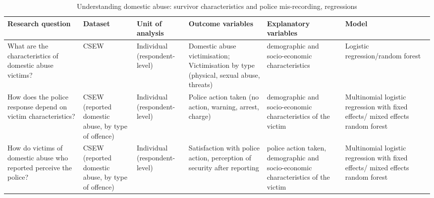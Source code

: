 \documentclass[11pt, a4paper]{article}
\begin{document}
\begin{table}[!htbp]
\caption{Understanding domestic abuse: survivor characteristics and police mis-recording, regressions}
  \begin{threeparttable}[t]
  \centering
       \begin{tabular}{ L{2.8cm}  C{1.8cm}  C{1.8cm}  C{3.2cm}  C{2.8cm}  C{2cm} }
    \toprule
     \textbf{Research question} & \textbf{Dataset}    & \textbf{Unit of analysis} & \textbf{Outcome variables} & \textbf{Explanatory variables} & \textbf{Model} \\
    \midrule
    What are the characteristics of domestic abuse victims? & CSEW & Individual (respondent-level) & Domestic abuse victimisation; Victimisation by type (physical, sexual abuse, threats) & demographic and socio-economic characteristics & Logistic regression/random forest \\
        \midrule
    How does the police response depend on victim characteristics? & CSEW (reported domestic abuse, by type of offence) & Individual (respondent-level) & Police action taken (no action, warning, arrest, charge) & demographic and socio-economic characteristics of the victim & Multinomial logistic regression with  fixed effects/ mixed effects random forest \\
     \midrule
    How do victims of domestic abuse who reported perceive the police? & CSEW (reported domestic abuse, by type of offence) & Individual (respondent-level)& Satisfaction with police action, perception of security after reporting & police action taken, demographic and socio-economic characteristics of the victim & Multinomial logistic regression with fixed effects/ mixed effects random forest \\
     \bottomrule
  \end{tabular}
    \end{threeparttable}%
  \label{tab:addlabel}%
\end{table}%
\end{document}
